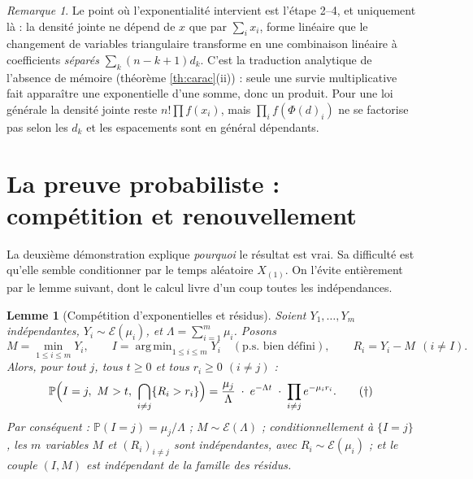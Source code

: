 \documentclass[11pt,a4paper]{article}
\theoremstyle{plain}
\newtheorem{lemme}[theoreme]{Lemme}
\theoremstyle{definition}
\theoremstyle{remark}
\newtheorem{remarque}[theoreme]{Remarque}
\newcommand{\Prob}{\mathbb{P}}
\newcommand{\Expo}{\mathcal{E}}
\newcommand{\Xord}[1]{X_{(#1)}}
\DeclareMathOperator*{\argmin}{arg\,min}
\begin{document}
\begin{remarque}
Le point où l'exponentialité intervient est l'étape 2--4, et uniquement là : la
densité jointe ne dépend de $x$ que par $\sum_i x_i$, forme linéaire que le
changement de variables triangulaire transforme en une combinaison linéaire à
coefficients \emph{séparés} $\sum_k(n-k+1)d_k$. C'est la traduction analytique de
l'absence de mémoire (théorème \ref{th:carac}(ii)) : seule une survie
multiplicative fait apparaître une exponentielle d'une somme, donc un produit.
Pour une loi générale la densité jointe reste $n!\prod f(x_i)$, mais
$\prod_i f(\Phi(d)_i)$ ne se factorise pas selon les $d_k$ et les espacements
sont en général dépendants.
\end{remarque}

\section{La preuve probabiliste : compétition et renouvellement}

La deuxième démonstration explique \emph{pourquoi} le résultat est vrai. Sa
difficulté est qu'elle semble conditionner par le temps aléatoire $\Xord1$. On
l'évite entièrement par le lemme suivant, dont le calcul livre d'un coup toutes
les indépendances.

\begin{lemme}[Compétition d'exponentielles et résidus]\label{lem:competition}
Soient $Y_1,\dots,Y_m$ indépendantes, $Y_i\sim\Expo(\mu_i)$, et
$\Lambda=\sum_{i=1}^m\mu_i$. Posons
\[
M=\min_{1\le i\le m}Y_i,\qquad I=\argmin_{1\le i\le m}Y_i\quad(\text{p.s.\ bien défini}),
\qquad R_i=Y_i-M\ \ (i\ne I).
\]
Alors, pour tout $j$, tous $t\ge0$ et tous $r_i\ge0$ $(i\ne j)$ :
\[
\Prob\Bigl(I=j,\ M>t,\ \bigcap_{i\ne j}\{R_i>r_i\}\Bigr)
=\frac{\mu_j}{\Lambda}\;\cdot\;e^{-\Lambda t}\;\cdot\;\prod_{i\ne j}e^{-\mu_i r_i}.
\tag{$\dagger$}
\]
Par conséquent :
$\Prob(I=j)=\mu_j/\Lambda$ ; $M\sim\Expo(\Lambda)$ ; conditionnellement à
$\{I=j\}$, les $m$ variables $M$ et $(R_i)_{i\ne j}$ sont indépendantes, avec
$R_i\sim\Expo(\mu_i)$ ; et le couple $(I,M)$ est indépendant de la famille des
résidus.
\end{lemme}
\end{document}
